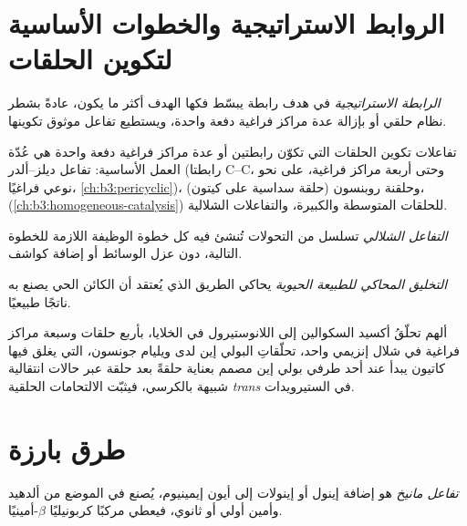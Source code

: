 \section{الروابط الاستراتيجية والخطوات الأساسية لتكوين الحلقات}

\begin{definition}\label{def:b3:total-synthesis:strategic-bond}
\emph{الرابطة الاستراتيجية} في هدف رابطة يبسّط
فكها الهدف أكثر ما يكون، عادةً بشطر نظام حلقي
أو بإزالة عدة مراكز فراغية دفعة واحدة، ويستطيع تفاعل موثوق
تكوينها.
\end{definition}

تفاعلات تكوين الحلقات التي تكوّن رابطتين أو عدة مراكز فراغية دفعة واحدة
هي عُدّة العمل الأساسية: تفاعل ديلز--ألدر (رابطتا C--C، وحتى أربعة
مراكز فراغية، على نحو نوعي فراغيًا، \cref{ch:b3:pericyclic})، وحلقنة
روبنسون (حلقة سداسية على كيتون)، 
(\cref{ch:b3:homogeneous-catalysis}) للحلقات المتوسطة والكبيرة، والتفاعلات الشلالية.

\begin{definition}\label{def:b3:total-synthesis:cascade}
\emph{التفاعل الشلالي} تسلسل من
التحولات تُنشئ فيه كل خطوة الوظيفة اللازمة للخطوة التالية،
دون عزل الوسائط أو إضافة كواشف.
\end{definition}

\begin{definition}\label{def:b3:total-synthesis:biomimetic}
\emph{التخليق المحاكي للطبيعة الحيوية} يحاكي الطريق
الذي يُعتقد أن الكائن الحي يصنع به ناتجًا طبيعيًا.
\end{definition}

ألهم تحلّقُ أكسيد السكوالين إلى اللانوستيرول في الخلايا، بأربع حلقات وسبعة
مراكز فراغية في شلال إنزيمي واحد، تحلّقاتِ البولي إين لدى
ويليام جونسون، التي يغلق فيها كاتيون يبدأ عند أحد طرفي بولي إين مصمم بعناية
حلقةً بعد حلقة عبر حالات انتقالية شبيهة بالكرسي، فيثبّت
الالتحامات الحلقية \textit{trans} في الستيرويدات.

\section{طرق بارزة}

\begin{definition}\label{def:b3:total-synthesis:mannich}
\emph{تفاعل مانيخ} هو إضافة إينول
أو إينولات إلى أيون إيمينيوم، يُصنع في الموضع من ألدهيد وأمين أولي أو
ثانوي، فيعطي مركبًا كربونيليًا $\beta$-أمينيًا.
\end{definition}

